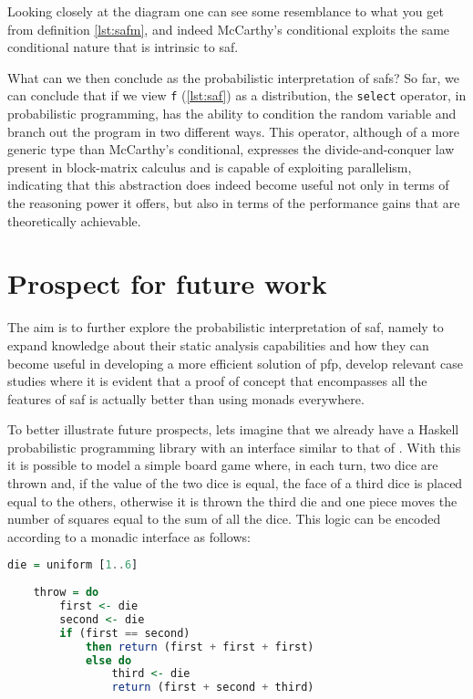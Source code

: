\documentclass[
  oneside,
  11pt, a4paper,
  footinclude=true,
  headinclude=true,
  cleardoublepage=empty
]{scrbook}
\theoremstyle{definition}
\theoremstyle{definition}
\begin{document}
        Looking closely at the diagram one can see some resemblance to what you get from definition \ref{lst:safm}, and indeed McCarthy's conditional exploits the same conditional nature that is intrinsic to \gls{saf}.
        
        What can we then conclude as the probabilistic interpretation of \gls{saf}s? So far, we can conclude that if we view \texttt{f} (\ref{lst:saf}) as a distribution, the \texttt {select} operator, in probabilistic programming, has the ability to condition the random variable and branch out the program in two different ways. This operator, although of a more generic type than McCarthy's conditional, expresses the divide-and-conquer law present in block-matrix calculus and is capable of exploiting parallelism, indicating that this abstraction does indeed become useful not only in terms of the reasoning power it offers, but also in terms of the performance gains that are theoretically achievable.
        
	\section{Prospect for future work}
	
	The aim is to further explore the probabilistic interpretation of \gls{saf}, namely to expand knowledge about their static analysis capabilities and how they can become useful in developing a more efficient solution of \gls{pfp}, develop relevant case studies where it is evident that a proof of concept that encompasses all the features of \gls{saf} is actually better than using monads everywhere.
	
	To better illustrate future prospects, lets imagine that we already have a Haskell probabilistic programming library with an interface similar to that of \cite{erwig_kollmansberger_2006}. With this it is possible to model a simple board game where, in each turn, two dice are thrown and, if the value of the two dice is equal, the face of a third dice is placed equal to the others, otherwise it is thrown the third die and one piece moves the number of squares equal to the sum of all the dice. This logic can be encoded according to a monadic interface as follows:
	
    \begin{lstlisting}[language=Haskell, caption={Monadic dice throw},captionpos=b]
    die = uniform [1..6]
    
    throw = do
        first <- die
        second <- die
        if (first == second)
            then return (first + first + first)
            else do
                third <- die
                return (first + second + third)
    \end{lstlisting}{}
    
\end{document}

